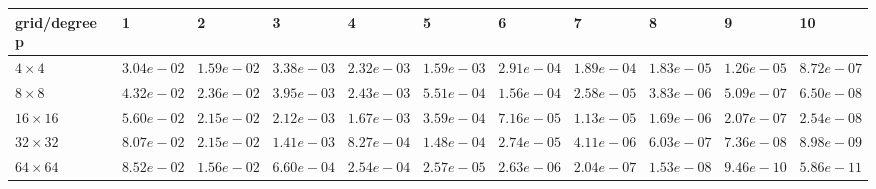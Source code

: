 \begin{tabular}{lllllllllll}
\hline
 grid/degree p   & 1          & 2          & 3          & 4          & 5          & 6          & 7          & 8          & 9          & 10         \\
\hline
 $4 \times 4$    & $3.04e-02$ & $1.59e-02$ & $3.38e-03$ & $2.32e-03$ & $1.59e-03$ & $2.91e-04$ & $1.89e-04$ & $1.83e-05$ & $1.26e-05$ & $8.72e-07$ \\
 $8 \times 8$    & $4.32e-02$ & $2.36e-02$ & $3.95e-03$ & $2.43e-03$ & $5.51e-04$ & $1.56e-04$ & $2.58e-05$ & $3.83e-06$ & $5.09e-07$ & $6.50e-08$ \\
 $16 \times 16$  & $5.60e-02$ & $2.15e-02$ & $2.12e-03$ & $1.67e-03$ & $3.59e-04$ & $7.16e-05$ & $1.13e-05$ & $1.69e-06$ & $2.07e-07$ & $2.54e-08$ \\
 $32 \times 32$  & $8.07e-02$ & $2.15e-02$ & $1.41e-03$ & $8.27e-04$ & $1.48e-04$ & $2.74e-05$ & $4.11e-06$ & $6.03e-07$ & $7.36e-08$ & $8.98e-09$ \\
 $64 \times 64$  & $8.52e-02$ & $1.56e-02$ & $6.60e-04$ & $2.54e-04$ & $2.57e-05$ & $2.63e-06$ & $2.04e-07$ & $1.53e-08$ & $9.46e-10$ & $5.86e-11$ \\
\hline
\end{tabular}